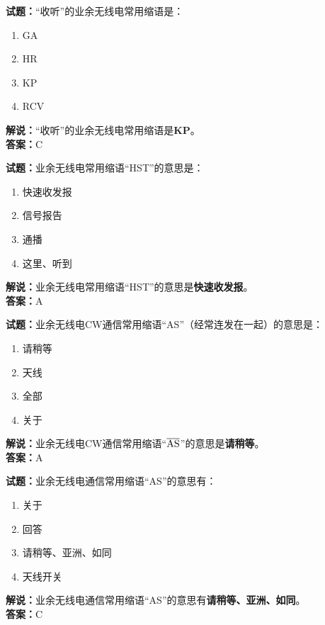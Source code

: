 \documentclass{ctexbook}
\begin{document}
\bigskip


\noindent\textbf{试题：}“收听”的业余无线电常用缩语是：
\begin{enumerate}[leftmargin=3em]
\item GA
\item HR
\item KP
\item RCV
\end{enumerate}
\noindent\textbf{解说：}“收听”的业余无线电常用缩语是\textbf{KP}。\\\noindent\textbf{答案：}C

\bigskip


\noindent\textbf{试题：}业余无线电常用缩语“HST”的意思是：
\begin{enumerate}[leftmargin=3em]
\item 快速收发报
\item 信号报告
\item 通播
\item 这里、听到
\end{enumerate}
\noindent\textbf{解说：}业余无线电常用缩语“HST”的意思是\textbf{快速收发报}。\\\noindent\textbf{答案：}A



\bigskip


\noindent\textbf{试题：}业余无线电CW通信常用缩语“AS”（经常连发在一起）的意思是：
\begin{enumerate}[leftmargin=3em]
\item 请稍等
\item 天线
\item 全部
\item 关于
\end{enumerate}
\noindent\textbf{解说：}业余无线电CW通信常用缩语“$\overline{\rm AS}$”的意思是\textbf{请稍等}。\\\noindent\textbf{答案：}A

\bigskip


\noindent\textbf{试题：}业余无线电通信常用缩语“AS”的意思有：
\begin{enumerate}[leftmargin=3em]
\item 关于
\item 回答
\item 请稍等、亚洲、如同
\item 天线开关
\end{enumerate}
\noindent\textbf{解说：}业余无线电通信常用缩语“AS”的意思有\textbf{请稍等、亚洲、如同}。\\\noindent\textbf{答案：}C
\end{document}
